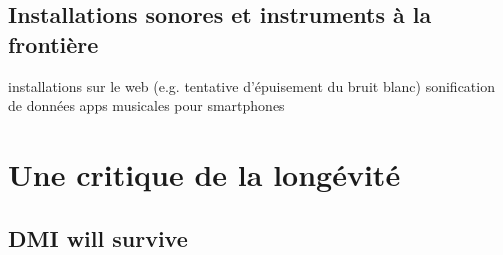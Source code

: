 \subsection{Installations sonores et instruments à la frontière}
installations sur le web (e.g. tentative d'épuisement du bruit blanc)
sonification de données
apps musicales pour smartphones

\section{Une critique de la longévité}
\label{sec:ephemerality:critique}

\subsection{DMI will survive}

